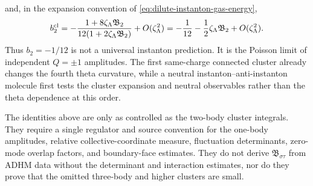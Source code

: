 \begin{controlledapproximation}
\begin{equation}
  \label{eq:instanton-first-cluster-curvatures}
\end{equation}
and, in the expansion convention of
\eqref{eq:dilute-instanton-gas-energy},
\begin{equation}
  b_2^{\rm cl}
  =
  -\frac{1+8\zeta_\Lambda\mathfrak B_2}
         {12(1+2\zeta_\Lambda\mathfrak B_2)}
  +O(\zeta_\Lambda^2)
  =
  -\frac1{12}-\frac12\zeta_\Lambda\mathfrak B_2
  +O(\zeta_\Lambda^2).
  \label{eq:instanton-first-cluster-b2}
\end{equation}
Thus \(b_2=-1/12\) is not a universal instanton prediction.  It is the
Poisson limit of independent \(Q=\pm1\) amplitudes.  The first same-charge
connected cluster already changes the fourth theta curvature, while a neutral
instanton--anti-instanton molecule first tests the cluster expansion and
neutral observables rather than the theta dependence at this order.

The identities above are only as controlled as the two-body cluster
integrals.  They require a single regulator and source convention for the
one-body amplitudes, relative collective-coordinate measure, fluctuation
determinants, zero-mode overlap factors, and boundary-face estimates.  They
do not derive \(\mathfrak B_{\sigma\tau}\) from ADHM data without the
determinant and interaction estimates, nor do they prove that the omitted
three-body and higher clusters are small.
\end{controlledapproximation}

